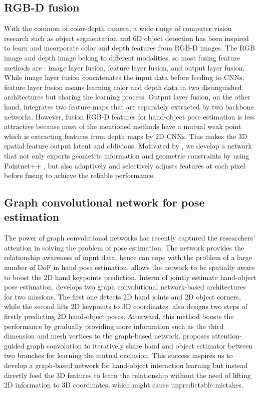 \subsection{RGB-D fusion}
With the common of color-depth camera, a wide range of computer vision research such as object segmentation \cite{chen2021global, chen2020bi, park2017rdfnet, zhang2021non} and 6D object detection \cite{wang2019densefusion, tian2020robust, saadi2021optimizing} has been inspired to learn and incorporate color and depth features from RGB-D images. The RGB image and depth image belong to different modalities, so most fusing feature methods are \cite{wang2021brief}: image layer fusion, feature layer fusion, and output layer fusion. While image layer fusion concatenates the input data before feeding to CNNs, feature layer fusion means learning color and depth data in two distinguished architectures but sharing the learning process. Output layer fusion, on the other hand, integrates two feature maps that are separately extracted by two backbone networks. However, fusion RGB-D features for hand-object pose estimation is less attractive because most of the mentioned methods have a mutual weak point which is extracting features from depth maps by 2D CNNs. This makes the 3D spatial feature output latent and oblivious. Motivated by \cite{wang2019densefusion}, we develop a network that not only exports geometric information and geometric constraints by using Pointnet++ \cite{qi2017pointnet++}, but also adaptively and selectively adjusts features at each pixel before fusing to achieve the reliable performance. 

\subsection{Graph convolutional network  for pose estimation}
The power of graph convolutional networks has recently captured the researchers' attention in solving the problem of pose estimation. The network provides the relationship awareness of input data, hence can cope with the problem of a large number of DoF in hand pose estimation. \cite{kong2020sia} allows the network to be spatially aware to boost the 2D hand keypoints prediction. Interm of jointly estimate hand-object pose estimation, \cite{doosti2020hope} develops two graph convolutional network-based architectures for two missions. The first one detects 2D hand joints and 2D object corners, while the second lifts 2D keypoints to 3D coordinates. \cite{almadani2021graph} also designs two steps of firstly predicting 2D hand-object poses. Afterward, this method boosts the performance by gradually providing more information such as the third dimension and mesh vertices to the graph-based network. \cite{tse2022collaborative} proposes attention-guided graph convolution to iteratively share hand and object estimator between two branches for learning the mutual occlusion. This success inspires us to develop a graph-based network for hand-object interaction learning but instead directly feed the 3D features to learn the relationship without the need of lifting 2D information to 3D coordinates, which might cause unpredictable mistakes.
